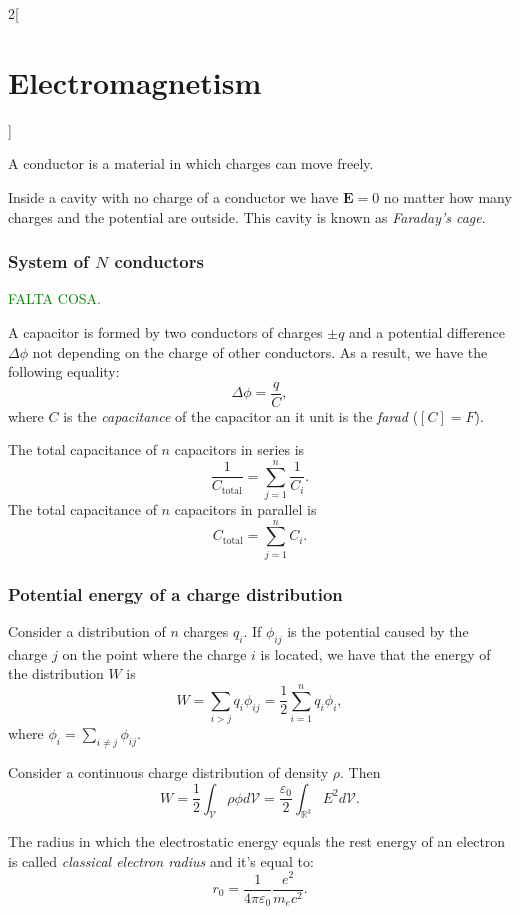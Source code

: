 \documentclass[class=article,10pt,crop=false]{standalone}
\begin{document}
\begin{multicols}{2}[\section{Electromagnetism}]
\begin{concept}
\end{concept}
\begin{definition}
A conductor is a material in which charges can move freely.
\end{definition}
\begin{concept}
Inside a cavity with no charge of a conductor we have $\boldsymbol{E}=0$ no matter how many charges and the potential are outside. This cavity is known as \textit{Faraday's cage}.
\end{concept}
\subsubsection*{System of $N$ conductors}
\textcolor{green}{FALTA COSA.}
\begin{definition}[Capacitor]
A capacitor is formed by two conductors of charges $\pm q$ and a potential difference $\Delta\phi$ not depending on the charge of other conductors. As a result, we have the following equality: $$\Delta\phi=\frac{q}{C},$$ where $C$ is the \textit{capacitance} of the capacitor an it unit is the \textit{farad} ($[C]=F$).
\end{definition}
\begin{concept}
The total capacitance of $n$ capacitors in series is $$\frac{1}{C_\text{total}}=\sum_{j=1}^n\frac{1}{C_i}.$$
The total capacitance of $n$ capacitors in parallel is $$C_\text{total}=\sum_{j=1}^nC_i.$$
\end{concept}
\subsubsection*{Potential energy of a charge distribution}
\begin{concept}
Consider a distribution of $n$ charges $q_i$. If $\phi_{ij}$ is the potential caused by the charge $j$ on the point where the charge $i$ is located, we have that the energy of the distribution $W$ is $$W=\sum_{i>j}q_i\phi_{ij}=\frac{1}{2}\sum_{i=1}^nq_i\phi_i,$$ where $\displaystyle\phi_i=\sum_{i\ne j}\phi_{ij}$.
\end{concept}
\begin{concept}
Consider a continuous charge distribution of density $\rho$. Then $$W=\frac{1}{2}\int_\mathcal{V}\rho\phi d\mathcal{V}=\frac{\varepsilon_0}{2}\int_{\mathbb{R}^3}E^2d\mathcal{V}.$$
\end{concept}
\begin{definition}
The radius in which the electrostatic energy equals the rest energy of an electron is called \textit{classical electron radius} and it's equal to: $$r_0=\frac{1}{4\pi\varepsilon_0}\frac{e^2}{m_ec^2}.$$
\end{definition}
\end{multicols}
\end{document}
